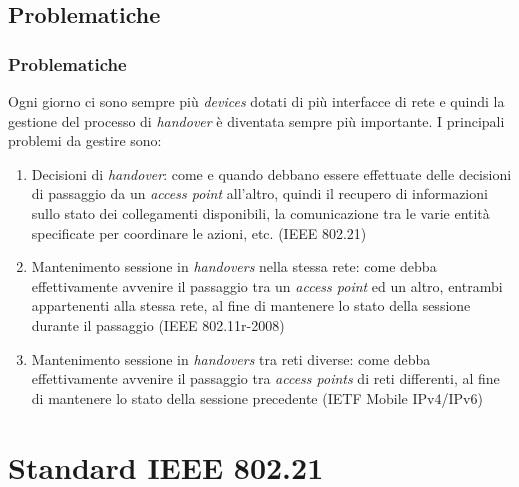 \documentclass[10pt]{beamer}
\begin{document}
\subsection{Problematiche}
\begin{frame}
\frametitle{Problematiche}
Ogni giorno ci sono sempre più {\em devices} dotati di più interfacce di rete e quindi la gestione del processo di {\em handover} è diventata sempre più importante. I principali problemi da gestire sono:
\begin{enumerate}
\item Decisioni di {\em handover}: come e quando debbano essere effettuate delle decisioni di passaggio da un {\em access point} all'altro, quindi il recupero di informazioni sullo stato dei collegamenti disponibili, la comunicazione tra le varie entità specificate per coordinare le azioni, etc. (IEEE 802.21)
\item Mantenimento sessione in {\em handovers} nella stessa rete: come debba effettivamente avvenire il passaggio tra un {\em access point} ed un altro, entrambi appartenenti alla stessa rete, al fine di mantenere lo stato della sessione durante il passaggio (IEEE 802.11r-2008)
\item Mantenimento sessione in {\em handovers} tra reti diverse: come debba effettivamente avvenire il passaggio tra {\em access points} di reti differenti, al fine di mantenere lo stato della sessione precedente (IETF Mobile IPv4/IPv6)
\end{enumerate}
\end{frame}


\section{Standard IEEE 802.21}
\end{document}
